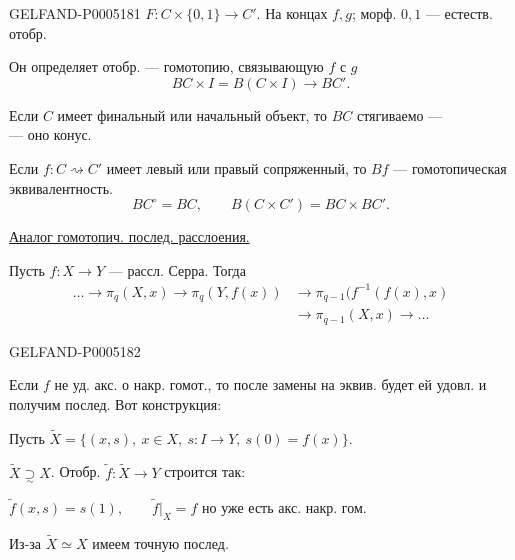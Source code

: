 \begin{GelfandAdjacentEvidence}{GELFAND-P000518}{1}
$F:C\times\{0,1\}\to C'$. На концах $f,g$; морф. $0,1$ — естеств. отобр.

Он определяет отобр. — гомотопию, связывающую $f$ с $g$
\[
BC\times I=B(C\times I)\to BC'.
\]

Если $C$ имеет финальный или начальный объект, то $BC$ стягиваемо —\\
— оно конус.

Если $f:C\rightsquigarrow C'$ имеет левый или правый сопряженный, то $Bf$ — гомотопическая эквивалентность.
\[
BC^{\circ}=BC,\qquad B(C\times C')=BC\times BC'.
\]

\uline{Аналог гомотопич. послед. расслоения.}

Пусть $f:X\to Y$ — рассл. Серра. Тогда
\[
\begin{aligned}
\ldots\to\pi_q(X,x)\to\pi_q(Y,f(x))
&\to\pi_{q-1}(f^{-1}(f(x),x)\\
&\to\pi_{q-1}(X,x)\to\ldots
\end{aligned}
\]
\end{GelfandAdjacentEvidence}
\begin{GelfandAdjacentEvidence}{GELFAND-P000518}{2}


Если $f$ не уд. акс. о накр. гомот., то после замены на эквив. будет ей удовл. и получим послед. Вот конструкция:

Пусть $\widetilde X=\{(x,s),\ x\in X,\ s:I\to Y,\ s(0)=f(x)\}$.

$\widetilde X\underset{\sim}{\supset}X$. Отобр. $\widetilde f:\widetilde X\to Y$ строится так:

$\widetilde f(x,s)=s(1),\qquad\widetilde f|_X=f$ но уже есть акс. накр. гом.

Из-за $\widetilde X\simeq X$ имеем точную послед.
\end{GelfandAdjacentEvidence}
